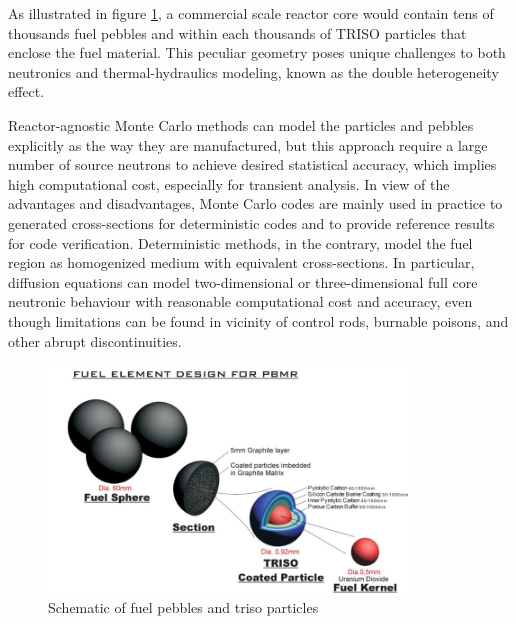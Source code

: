 \documentclass{elsarticle}
\begin{document}
As illustrated in figure \ref{fig:triso}, a commercial scale reactor core would contain tens of thousands fuel pebbles and within each thousands of TRISO particles that enclose the fuel material. This peculiar geometry poses unique challenges to both neutronics and thermal-hydraulics modeling, known as the double heterogeneity effect. 

Reactor-agnostic Monte Carlo methods can model the particles and pebbles explicitly as the way they are manufactured, but this approach require a large number of source neutrons to achieve desired statistical accuracy, which implies high computational cost, especially for transient analysis. In view of the advantages and disadvantages, Monte Carlo codes are mainly used in practice to generated cross-sections for deterministic codes and to provide reference results for code verification. Deterministic methods, in the contrary, model the fuel region as homogenized medium with equivalent cross-sections. In particular, diffusion equations can model two-dimensional or three-dimensional full core neutronic behaviour with reasonable computational cost and accuracy, even though limitations can be found in vicinity of control rods, burnable poisons, and other abrupt discontinuities.

\begin{figure}
  \centering
  \includegraphics[width=0.85\textwidth]{./images/design/TMSR_fuel.jpg}
  \caption{Schematic of fuel pebbles and triso particles}
  \label{fig:triso}
\end{figure}
\end{document}
